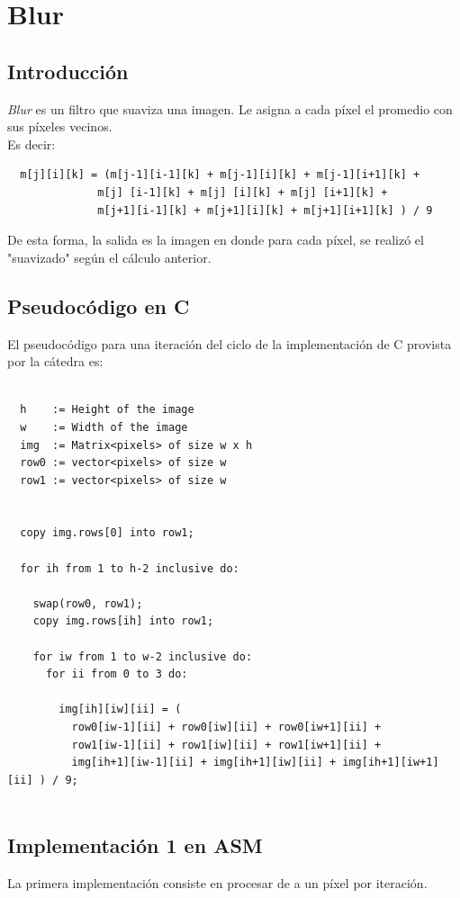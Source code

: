 \section{Blur}
\subsection{Introducción}
\textit{Blur} es un filtro que suaviza una imagen. Le asigna a cada píxel el promedio con sus píxeles vecinos.\\ Es decir:

\begin{verbatim}
  m[j][i][k] = (m[j-1][i-1][k] + m[j-1][i][k] + m[j-1][i+1][k] + 
              m[j] [i-1][k] + m[j] [i][k] + m[j] [i+1][k] + 
              m[j+1][i-1][k] + m[j+1][i][k] + m[j+1][i+1][k] ) / 9
\end{verbatim}

De esta forma, la salida es la imagen en donde para cada píxel, se realizó el "suavizado" según el cálculo anterior.

\subsection{Pseudocódigo en C}

El pseudocódigo para una iteración del ciclo de la implementación de C provista por la cátedra es:

\begin{lstlisting}

  h    := Height of the image
  w    := Width of the image
  img  := Matrix<pixels> of size w x h
  row0 := vector<pixels> of size w
  row1 := vector<pixels> of size w


  copy img.rows[0] into row1;
  
  for ih from 1 to h-2 inclusive do: 

    swap(row0, row1);
    copy img.rows[ih] into row1;

    for iw from 1 to w-2 inclusive do:
      for ii from 0 to 3 do:
        
        img[ih][iw][ii] = ( 
          row0[iw-1][ii] + row0[iw][ii] + row0[iw+1][ii] +
          row1[iw-1][ii] + row1[iw][ii] + row1[iw+1][ii] +
          img[ih+1][iw-1][ii] + img[ih+1][iw][ii] + img[ih+1][iw+1][ii] ) / 9;


\end{lstlisting}

\subsection{Implementación 1 en ASM}
La primera implementación consiste en procesar de a un píxel por iteración.\\


